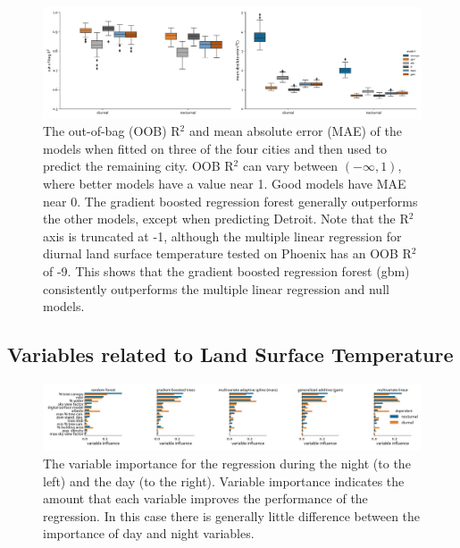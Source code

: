 \documentclass[final,3p,times,twocolumn,sort&compress]{elsarticle}
\begin{document}
\begin{figure}
    \centering
    \includegraphics[width=\linewidth]{fig/report/holdout_results_500.pdf}
    \caption{
    The out-of-bag (OOB) R$^2$ and mean absolute error (MAE) of the models when fitted on three of the four cities and then used to predict the remaining city. OOB R$^2$ can vary between $(-\infty, 1)$, where better models have a value near 1. Good models have MAE near 0. The gradient boosted regression forest generally outperforms the other models, except when predicting Detroit. Note that the R$^2$ axis is truncated at -1, although the multiple linear regression for diurnal land surface temperature tested on Phoenix has an OOB R$^2$ of -9.  This shows that the gradient boosted regression forest (gbm) consistently outperforms the multiple linear regression and null models.
    }
    \label{fig:holdout_results}
\end{figure}

\subsection{Variables related to Land Surface Temperature}

\begin{figure}
\begin{center}
\includegraphics[width=\textwidth]{fig/report/variableImportance_500.pdf}
\caption{The variable importance for the regression during the night (to the left) and the day (to the right). Variable importance indicates the amount that each variable improves the performance of the regression.
In this case there is generally little difference between the importance of day and night variables.}
\label{fig:importance}
\end{center}
\end{figure}
\end{document}
